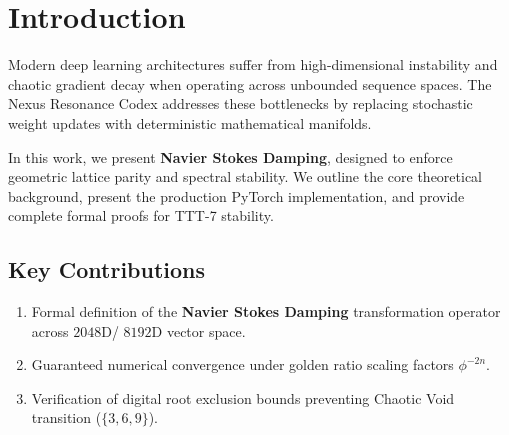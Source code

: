 \section{Introduction}
Modern deep learning architectures suffer from high-dimensional instability and chaotic gradient decay when operating across unbounded sequence spaces. The Nexus Resonance Codex addresses these bottlenecks by replacing stochastic weight updates with deterministic mathematical manifolds.

In this work, we present \textbf{Navier Stokes Damping}, designed to enforce geometric lattice parity and spectral stability. We outline the core theoretical background, present the production PyTorch implementation, and provide complete formal proofs for TTT-7 stability.

\subsection{Key Contributions}
\begin{enumerate}[label=\textbf{\arabic*.}]
    \item Formal definition of the \textbf{Navier Stokes Damping} transformation operator across $2048$D/ $8192$D vector space.
    \item Guaranteed numerical convergence under golden ratio scaling factors $\phi^{-2n}$.
    \item Verification of digital root exclusion bounds preventing Chaotic Void transition ($\{3, 6, 9\}$).
\end{enumerate}